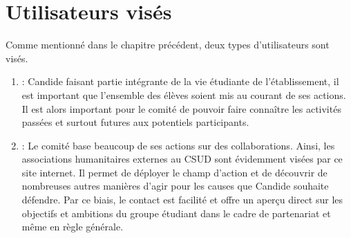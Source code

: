 \documentclass[a4,10pt,french]{sphinxmanual}
\begin{document}
\section{Utilisateurs visés}
\label{\detokenize{introduction:utilisateurs-vises}}
\sphinxAtStartPar
Comme mentionné dans le chapitre précédent, deux types d’utilisateurs sont visés.
\begin{enumerate}
%
\item {} 
\sphinxAtStartPar
{}: Candide faisant partie intégrante de la vie étudiante de l’établissement, il est important que l’ensemble des élèves soient mis au courant de ses actions. Il est alors important pour le comité de pouvoir faire connaître les activités passées et surtout futures aux potentiels participants.

\item {} 
\sphinxAtStartPar
{}: Le comité base beaucoup de ses actions sur des collaborations. Ainsi, les associations humanitaires externes au CSUD sont évidemment visées par ce site internet. Il permet de déployer le champ d’action et de découvrir de nombreuses autres manières d’agir pour les causes que Candide souhaite défendre. Par ce biais, le contact est facilité et offre un aperçu direct sur les objectifs et ambitions du groupe étudiant dans le cadre de partenariat et même en règle générale.

\end{enumerate}
\end{document}
